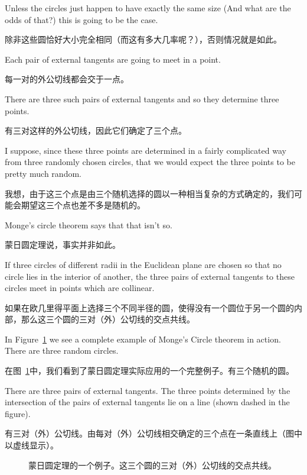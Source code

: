 Unless the circles just happen to have exactly the same size
(And what are the odds of that?) this is going to be the case.

除非这些圆恰好大小完全相同（而这有多大几率呢？），否则情况就是如此。

Each pair of external tangents are going to meet in a point.

每一对的外公切线都会交于一点。

There are three such pairs of external tangents and so they determine three points.

有三对这样的外公切线，因此它们确定了三个点。

I suppose, since these three 
points are determined in a fairly complicated way from three randomly chosen
circles, that we would expect the three points to be pretty much random.

我想，由于这三个点是由三个随机选择的圆以一种相当复杂的方式确定的，我们可能会期望这三个点也差不多是随机的。

Monge's circle theorem says that that isn't so.

蒙日圆定理说，事实并非如此。

\begin{thm} 
If three circles of different radii in the Euclidean plane are 
chosen so that no circle lies in the interior of another, the 
three pairs of external tangents to these circles meet in 
points which are collinear.
\end{thm}

\begin{thm}[蒙日圆定理]
如果在欧几里得平面上选择三个不同半径的圆，使得没有一个圆位于另一个圆的内部，那么这三个圆的三对（外）公切线的交点共线。
\end{thm}

In Figure~\ref{fig:monge2} we see a complete example of Monge's Circle theorem
in action.  There are three random circles.

在图~\ref{fig:monge2}中，我们看到了蒙日圆定理实际应用的一个完整例子。有三个随机的圆。

There are three pairs of external
tangents.  The three points determined by the intersection of the pairs of 
external tangents lie on a line (shown dashed in the figure).

有三对（外）公切线。由每对（外）公切线相交确定的三个点在一条直线上（图中以虚线显示）。

\begin{figure}[!hbtp] 
\begin{center}

\end{center}
\caption[Example of Monge's circle theorem.]{An example of Monge's %
circle theorem. The three pairs of external %
tangents to the circles intersect in points which are collinear.}
\caption[蒙日圆定理的例子。]{蒙日圆定理的一个例子。这三个圆的三对（外）公切线的交点共线。}
\label{fig:monge2}
\end{figure}
 
